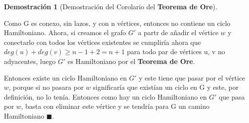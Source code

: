 \documentclass[a4paper,1pt]{report}
\newtheorem*{dem}{Demostración}
\begin{document}
\begin{dem}[Demostración del Corolario del \textbf{Teorema de Ore}]
 
\end{dem}

Como G es conexo, sin lazos, y con n vértices, entonces no contiene un ciclo Hamiltoniano. Ahora, si creamos el grafo $G'$ a partr de añadir el vértice $w$ y conectarlo con todos los vértices existentes se cumpliría ahora  que\\ $deg(u)+deg(v)\geq n - 1 + 2 = n + 1$ para todo par de vértices u, v no adyacentes,
luego $G'$ es Hamiltoniano por el \textbf{Teorema de Ore}.

Entonces existe un ciclo Hamiltoniano en $G'$ y este tiene que pasar por el vértice $w$, porque si no pasara por $w$ significaría que existían un ciclo en G y este, por definición, no lo tenía. Entonces como hay un ciclo Hamiltoniano en $G'$ que pasa por $w$, basta con eliminar este vértice y se tendría para G un camino Hamiltoniano $\blacksquare$.
\end{document}
